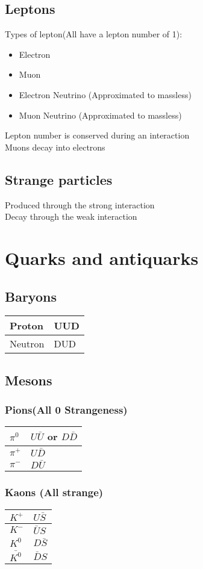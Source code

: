\documentclass{article}[18pt]
\begin{document}
\subsection{Leptons}
Types of lepton(All have a lepton number of 1):
\begin{itemize}
\item Electron
\item Muon
\item Electron Neutrino (Approximated to massless)
\item Muon Neutrino (Approximated to massless)
\end{itemize}
Lepton number is conserved during an interaction\\
Muons decay into electrons\\
\subsection{Strange particles}
Produced through the strong interaction\\
Decay through the weak interaction
\newpage
\section{Quarks and antiquarks}
\subsection{Baryons}
{\def\arraystretch{1.2}
\begin{tabularx}{\textwidth}{|X|X|}
\hline
Proton&UUD\\
\hline
Neutron&DUD\\
\hline
\end{tabularx}}
\subsection{Mesons}
\subsubsection{Pions(All 0 Strangeness)}
{\def\arraystretch{1.5}
\begin{tabularx}{\textwidth}{|X|X|}
\hline
$\pi^0$&$U\bar{U}$ or $D\bar{D}$\\
\hline
$\pi^+$&$U\bar{D}$\\
\hline
$\pi^-$&$D\bar{U}$\\
\hline
\end{tabularx}}
\subsubsection{Kaons (All strange)}
{\def\arraystretch{1.5}
\begin{tabularx}{\textwidth}{|X|X|}
\hline
$K^+$&$U\bar{S}$\\
\hline
$K^-$&$\bar{U}S$\\
\hline
$K^0$&$D\bar{S}$\\
\hline
$\bar{K^0}$&$\bar{D}S$\\
\hline
\end{tabularx}}
\end{document}
